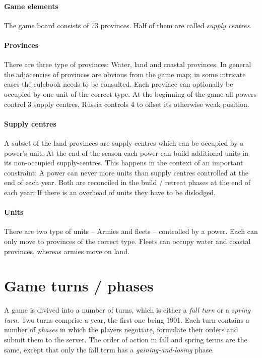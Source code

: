 \documentclass[pdftex,11pt,a4paper]{report}
\begin{document}
\paragraph{Game elements}

The game board consists of 73 provinces. Half of them are 
called \textit{supply centres}.

\paragraph{Provinces}

There are three type of provinces: Water, land and coastal 
provinces. In general the adjacencies of provinces are obvious
from the game map; in some intricate cases the rulebook needs to
be consulted. Each province can optionally be occupied by one
unit of the correct type. At the beginning of the game all powers
control 3 supply centres, Russia controls 4 to offset its
otherwise weak position.

\paragraph{Supply centres}

A subset of the land provinces are supply centres which can be 
occupied by a power's unit. At the end of the season each power
can build additional units in its non-occupied supply-centres.
This happens in the context of an important constraint: A power 
can never more units than supply centres controlled at the end
of each year. Both are reconciled in the build / retreat phases
at the end of each year: If there is an overhead of units they
have to be dislodged.

\paragraph{Units}

There are two type of units -- Armies and fleets -- controlled
by a power. Each can only move to provinces of the correct type.
Fleets can occupy water and coastal provinces, whereas armies 
move on land.

\section{Game turns / phases}

A game is divived into a number of turns, which is either a
\textit{fall turn} or a \textit{spring turn}. Two turns comprise
a year, the first one being 1901. Each turn contains a number of 
\textit{phases} in which the players negotiate, formulate
their orders and submit them to the server. The order of action in
fall and spring terms are the same, except that only the fall term
has a \textit{gaining-and-losing} phase.
\end{document}
